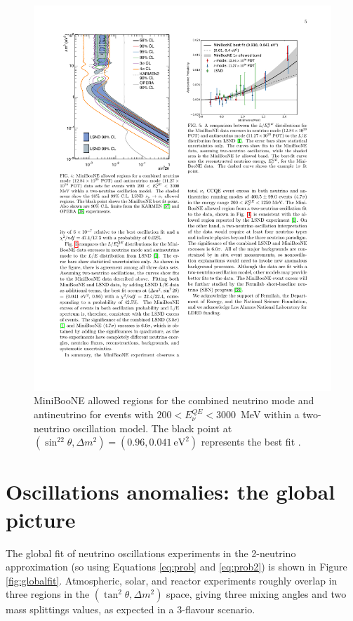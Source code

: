 \begin{figure}[htbp]
    \centering
    \includegraphics[width=0.7\linewidth]{figures/miniboone_bestfit.pdf}
    \caption{MiniBooNE allowed regions for the combined neutrino mode and antineutrino for events with $200<E_{\nu}^{QE}<3000$~MeV within a two-neutrino oscillation model. The black point at $( \sin^22\theta, \Delta m^2)=(0.96, 0.041~\mathrm{eV^2})$ represents the best fit \cite{Aguilar-Arevalo:2018gpe}.}
    \label{fig:miniboone_bestfit}
\end{figure}


\section{Oscillations anomalies: the global picture}
The global fit of neutrino oscillations experiments in the 2-neutrino approximation (so using Equations \ref{eq:prob} and \ref{eq:prob2}) is shown in Figure \ref{fig:globalfit}. Atmospheric, solar, and reactor experiments roughly overlap in three regions in the $(\tan^2\theta, \Delta m^2)$ space, giving three mixing angles and two mass splittings values, as expected in a 3-flavour scenario. 

